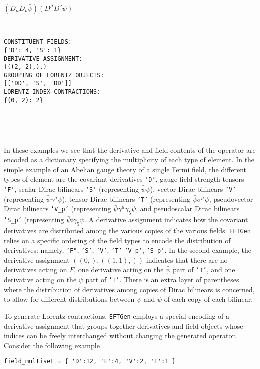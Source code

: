 \documentclass[11pt,BCOR=5mm]{article}
\begin{document}
\

$(D_{\mu}D_{\nu}\bar{\psi})  (D^{\mu} D^{\nu} \psi) $

\

\begin{lstlisting}[numbers=none]
CONSTITUENT FIELDS: 
{'D': 4, 'S': 1}
DERIVATIVE ASSIGNMENT: 
(((2, 2),),)
GROUPING OF LORENTZ OBJECTS: 
[['DD', 'S', 'DD']]
LORENTZ INDEX CONTRACTIONS: 
{(0, 2): 2}
\end{lstlisting}


\

\

\noindent In these examples we see that the derivative and field contents of the operator are encoded as a dictionary specifying the multiplicity of each type of element. In the simple example of an Abelian gauge theory of a single Fermi field, the different types of element are the covariant derivatives \texttt{'D'}, gauge field strength tensors \texttt{'F'}, scalar Dirac bilinears  \texttt{'S'} (representing $\bar{\psi} \psi$), vector Dirac bilinears  \texttt{'V'} (representing $\bar{\psi} \gamma^{\mu} \psi$), tensor Dirac bilinears  \texttt{'T'} (representing $\bar{\psi} \sigma^{\mu} \psi$, pseudovector Dirac bilinears  \texttt{'V\_p'} (representing $\bar{\psi} \gamma^{\mu}\gamma_5 \psi$, and pseudoscalar Dirac bilinears  \texttt{'S\_p'} (representing $\bar{\psi} i\gamma_5 \psi$. A derivative assignment indicates how the covariant derivatives are distributed among the various copies of the various fields. \texttt{EFTGen} relies on a specific ordering of the field types to encode the distribution of derivatives: namely, \texttt{'F"},  \texttt{'S'},  \texttt{'V'}, \texttt{'T'}  \texttt{'V\_p'},  \texttt{'S\_p'}. In the second example, the derivative assignment $((0,), ((1, 1),))$ indicates that there are no derivatives acting on $F$, one derivative acting on the $\bar{\psi}$ part of  \texttt{'T'}, and one derivative acting on the $\psi$ part of  \texttt{'T'}. There is an extra layer of parentheses where the distribution of derivatives among copies of Dirac bilinears is concerned, to allow for different distributions between $\bar{\psi}$ and $\psi$ of each copy of each bilinear. 

To generate Lorentz contractions, \texttt{EFTGen} employs a special encoding of a derivative assignment that groups together derivatives and field objects whose indices can be freely interchanged without changing the generated operator. Consider the following example

\begin{lstlisting}[numbers=none]
field_multiset = { 'D':12, 'F':4, 'V':2, 'T':1 }
\end{lstlisting}
\end{document}
